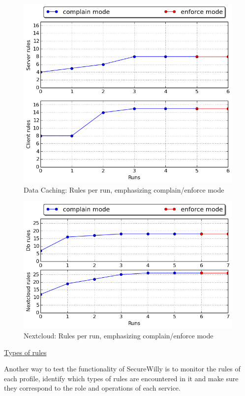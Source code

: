 \hfill\break

\begin{figure}[h!]
  \centering
   \includegraphics[width=0.75\linewidth]{figures/datacaching/complain_enforce_rules.png}
   \caption{Data Caching: Rules per run, emphasizing complain/enforce mode}
\end{figure}

\begin{figure}[h!]
  \centering
   \includegraphics[width=0.75\linewidth]{figures/nextcloud/complain_enforce_rules.png}
   \caption{Nextcloud: Rules per run, emphasizing complain/enforce mode}
\end{figure}
\hfill\break
\hfill\break
\underline{Types of rules}
\hfill\break

Another way to test the functionality of SecureWilly is to monitor the rules of each profile, identify which types of rules are encountered in it and make sure they correspond to the role and operations of each service.

